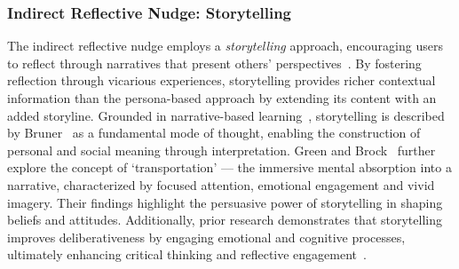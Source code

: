 \subsubsection{Indirect Reflective Nudge: Storytelling}
The indirect reflective nudge employs a \textit{storytelling} approach, encouraging users to reflect through narratives that present others' perspectives~\cite{batson1997perspective, yeo2024help}. By fostering reflection through vicarious experiences, storytelling provides richer contextual information than the persona-based approach by extending its content with an added storyline. Grounded in narrative-based learning~\cite{bruner1991narrative, green2000role}, storytelling is described by Bruner~\cite{bruner1991narrative} as a fundamental mode of thought, enabling the construction of personal and social meaning through interpretation. Green and Brock~\cite{green2000role} further explore the concept of `transportation' --- the immersive mental absorption into a narrative, characterized by focused attention, emotional engagement and vivid imagery. Their findings highlight the persuasive power of storytelling in shaping beliefs and attitudes. Additionally, prior research demonstrates that storytelling improves deliberativeness by engaging emotional and cognitive processes, ultimately enhancing critical thinking and reflective engagement~\cite{yeo2024help}.

\paragraph{} 

